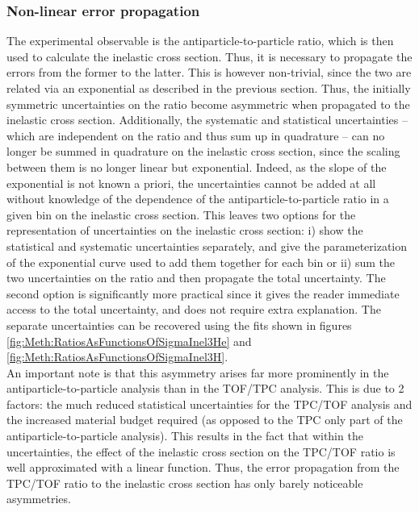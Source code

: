 \subsubsection{Non-linear error propagation}
The experimental observable is the antiparticle-to-particle ratio, which is then used to calculate the inelastic cross section. Thus, it is necessary to propagate the errors from the former to the latter. This is however non-trivial, since the two are related via an exponential as described in the previous section. Thus, the initially symmetric uncertainties on the ratio become asymmetric when propagated to the inelastic cross section. Additionally, the systematic and statistical uncertainties -- which are independent on the ratio and thus sum up in quadrature -- can no longer be summed in quadrature on the inelastic cross section, since the scaling between them is no longer linear but exponential. Indeed, as the slope of the exponential is not known a priori, the uncertainties cannot be added at all without knowledge of the dependence of the antiparticle-to-particle ratio in a given bin on the inelastic cross section. This leaves two options for the representation of uncertainties on the inelastic cross section: i) show the statistical and systematic uncertainties separately, and give the parameterization of the exponential curve used to add them together for each bin or ii) sum the two uncertainties on the ratio and then propagate the total uncertainty. The second option is significantly more practical since it gives the reader immediate access to the total uncertainty, and does not require extra explanation. The separate uncertainties can be recovered using the fits shown in figures \ref{fig:Meth:RatiosAsFunctionsOfSigmaInel3He} and \ref{fig:Meth:RatiosAsFunctionsOfSigmaInel3H}. \\

An important note is that this asymmetry arises far more prominently in the antiparticle-to-particle analysis than in the TOF/TPC analysis. This is due to 2 factors: the much reduced statistical uncertainties for the TPC/TOF analysis and the increased material budget required (as opposed to the TPC only part of the antiparticle-to-particle analysis). This results in the fact that within the uncertainties, the effect of the inelastic cross section on the TPC/TOF ratio is well approximated with a linear function. Thus, the error propagation from the TPC/TOF ratio to the inelastic cross section has only barely noticeable asymmetries. 


